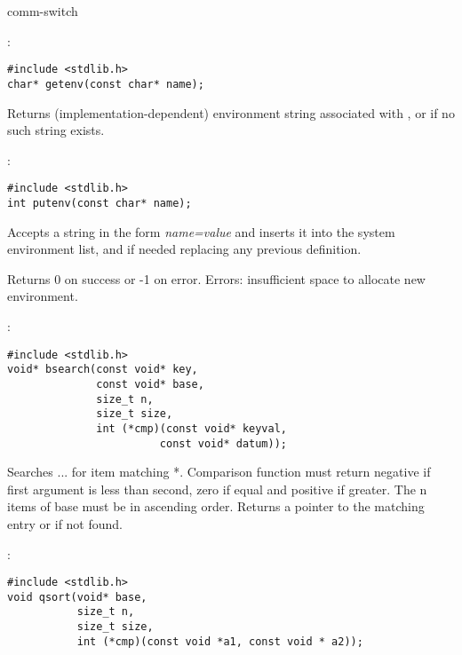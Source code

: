 \begin{Ventry2}{comm-switch  }
\item[getenv]
\label{item:getenv}
:
\begin{production}
\begin{verbatim}
#include <stdlib.h>
char* getenv(const char* name);
\end{verbatim}
\end{production}

     Returns (implementation-dependent) environment string associated with
     , or  if no such string exists.


\item[puttenv]
\label{item:putenv}
:
\begin{production}
\begin{verbatim}
#include <stdlib.h>
int putenv(const char* name);
\end{verbatim}
\end{production}

	Accepts a string in the form {\it name=value} and inserts it into the
	system environment list, and if needed replacing any previous definition.

     	Returns 0 on success or -1 on error. Errors:  insufficient space to allocate 
	new environment.


\item[besearch]
\label{item:bsearch}
:
\begin{production}
\begin{verbatim}
#include <stdlib.h>
void* bsearch(const void* key, 
              const void* base, 
              size_t n, 
              size_t size, 
              int (*cmp)(const void* keyval, 
                        const void* datum));
\end{verbatim}
\end{production}

     Searches ... for item matching
     *. Comparison function  must return negative if
     first argument is less than second, zero if equal and positive if
     greater. The n items of base must be in ascending order. Returns
     a pointer to the matching entry or  if not found.

\item[qsort]
\label{item:qsort}
:
\begin{production}
\begin{verbatim}
#include <stdlib.h>
void qsort(void* base, 
           size_t n, 
           size_t size, 
           int (*cmp)(const void *a1, const void * a2));
\end{verbatim}
\end{production}


\end{Ventry2}

